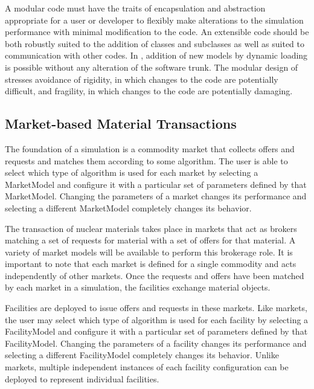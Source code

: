 A modular code must have the traits of encapsulation and abstraction 
appropriate for a user or developer to flexibly make alterations to 
the simulation performance with minimal modification to the code. An 
extensible code should be both robustly suited to the addition of 
classes and subclasses as well as suited to communication with other codes.
In \Cyclus, addition of new models by dynamic loading is possible without 
any alteration of the software trunk. The modular design of \Cyclus stresses
avoidance of rigidity, in which changes to the code are potentially difficult, 
and fragility, in which changes to the code are potentially damaging.

\subsection{Market-based Material Transactions}

The foundation of a simulation is a commodity market that collects 
offers and requests and matches them according to some algorithm.  The 
user is able to select which type of algorithm is used for each market 
by selecting a MarketModel and configure it with a particular set of 
parameters defined by that MarketModel.  Changing the parameters of a 
market changes its performance and selecting a different MarketModel 
completely changes its behavior.

The transaction of nuclear materials takes place in markets that act
as brokers matching a set of requests for material with a set of
offers for that material. A variety of market models will be available
to perform this brokerage role. It is important to note that each
market is defined for a single commodity and acts independently of
other markets. Once the requests and offers have been matched by each
market in a simulation, the facilities exchange material objects.

Facilities are deployed to issue offers and requests in these markets.  
Like markets, the user may select which type of algorithm is used for 
each facility by selecting a FacilityModel and configure it with a 
particular set of parameters defined by that FacilityModel.  Changing 
the parameters of a facility changes its performance and selecting a 
different FacilityModel completely changes its behavior.  Unlike 
markets, multiple independent instances of each facility configuration 
can be deployed to represent individual facilities.


